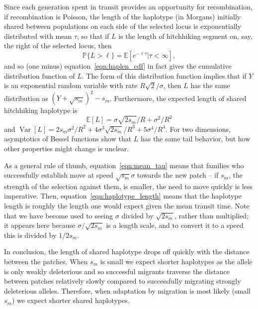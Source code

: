 \documentclass{article}
\DeclareMathOperator{\var}{Var}
\renewcommand{\P}{\mathbb{P}}
\newcommand{\E}{\mathbb{E}}
\begin{document}
Since each generation spent in transit provides an opportunity for recombination,
if recombination is Poisson, the length of the haplotype (in Morgans)
initially shared between populations on each side of the selected locus is exponentially distributed
with mean $\tau$, so that if $L$ is the length of hitchhiking segment on, say, the right of
the selected locus, then
\begin{equation} \label{eqn:haplen_cdf2}
\P\{L>\ell\} = \E[e^{-\ell \tau}|\tau<\infty] ,
\end{equation}
and so (one minus) equation~\eqref{eqn:haplen_cdf} in fact gives the cumulative distribution function of $L$.
The form of this distribution function implies that if $Y$ is an exponential random variable with rate $R\sqrt{2}/\sigma$,
then $L$ has the same distribution as $(Y + \sqrt{s_m})^2 - s_m$.
Furthermore, the expected length of shared hitchhiking haplotype is
\begin{equation} \label{eqn:haplotype_length}
\E[L] = \sigma \sqrt{2s_m}/R + \sigma^2/R^2
\end{equation}
and $\var[L] = 2s_m\sigma^2/R^2 + 4 \sigma^3 \sqrt{2s_m}/R^3 + 5 \sigma^4 / R^4$.
For two dimensions, asymptotics of Bessel functions show that $L$ has the same tail behavior,
but how other properties might change is unclear. 

As a general rule of thumb, equation~\eqref{eqn:mean_tau} means that families who successfully establish
move at speed $\sqrt{s_m} \sigma$ towards the new patch 
-- if $s_m$, the strength of the selection against them, is smaller, the need to move quickly is less imperative.
Then, equation~\eqref{eqn:haplotype_length} means that the haplotype length
is roughly the length one would expect given the mean transit time.
Note that we have become used to seeing $\sigma$ divided by $\sqrt{2s_m}$, rather than multiplied;
it appears here because $\sigma/\sqrt{2s_m}$ is a length scale, 
and to convert it to a speed this is divided by $1/2s_m$. 

In conclusion, the length of shared haplotype drops off quickly with the
distance between the patches. When $s_m$ is small we expect shorter
haplotypes as the allele is only weakly deleterious and so successful migrants
traverse the distance between patches relatively slowly 
compared to successfully migrating strongly deleterious alleles. 
Therefore, when adaptation by migration is most likely (small $s_m$) 
we expect shorter shared haplotypes.
\end{document}
